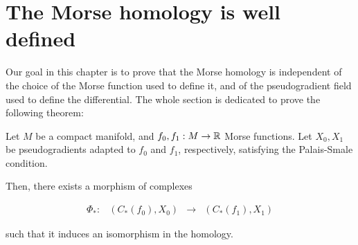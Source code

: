 \section{The Morse homology is well defined}

Our goal in this chapter is to prove that the Morse homology is independent of the choice of the Morse function used to define it, and of the pseudogradient field used to define the differential. The whole section is dedicated to prove the following theorem:

\begin{theo}
Let $M$ be a compact manifold, and $f_0, f_1 : M \rightarrow \mathbb{R}$ Morse functions. Let $X_0, X_1$ be pseudogradients adapted to $f_0$ and $f_1$, respectively, satisfying the Palais-Smale condition.

Then, there exists a morphism of complexes

\begin{equation} \label{morphism}
\begin{array}{rccc} \Phi_{\ast} : & (C_{\ast}(f_0), X_0) & \longrightarrow & (C_{\ast}(f_1), X_1) \end{array}
\end{equation}

such that it induces an isomorphism in the homology.
\end{theo}


